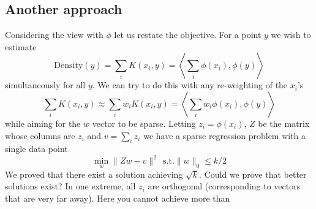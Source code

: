 \documentclass{article} %
\newcommand{\ip}[1]{\left \langle #1 \right \rangle}
\newcommand{\D}{\text{Density}}
\begin{document}
\subsection{Another approach}
Considering the view with $\phi$ let us restate the objective. For a point $y$ we wish to estimate
$$ \D(y) = \sum_i K(x_i,y) = \ip{\sum_i  \phi(x_i), \phi(y)} $$
simultaneously for all $y$. We can try to do this with any re-weighting of the $x_i$'s
$$ \sum_i K(x_i,y) \approx \sum_i w_i K(x_i,y) =  \ip{\sum_i w_i \phi(x_i), \phi(y)} $$
while aiming for the $w$ vector to be sparse. Letting $z_i=\phi(x_i)$, $Z$ be the matrix whose columns are $z_i$ and $v=\sum_i z_i$ we have a sparse regression problem with a single data point
$$ \min_w \| Zw -  v\|^2 \ \ \text{s.t.} \|w\|_0 \leq k/2$$
We proved that there exist a solution achieving $\sqrt{k}$. Could we prove that better solutions exist? In one extreme, all $z_i$ are orthogonal (corresponding to vectors that are very far away). Here you cannot achieve more than 
\end{document}
